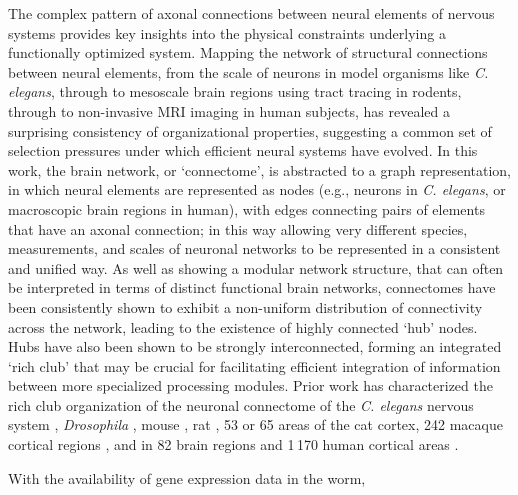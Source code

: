 \documentclass[10pt,letterpaper]{article}
\begin{document}
The complex pattern of axonal connections between neural elements of nervous systems provides key insights into the physical constraints underlying a functionally optimized system.
Mapping the network of structural connections between neural elements, from the scale of neurons in model organisms like \emph{C. elegans}, through to mesoscale brain regions using tract tracing in rodents, through to non-invasive MRI imaging in human subjects, has revealed a surprising consistency of organizational properties, suggesting a common set of selection pressures under which efficient neural systems have evolved.
In this work, the brain network, or `connectome', is abstracted to a graph representation, in which neural elements are represented as nodes (e.g., neurons in \emph{C. elegans}, or macroscopic brain regions in human), with edges connecting pairs of elements that have an axonal connection; in this way allowing very different species, measurements, and scales of neuronal networks to be represented in a consistent and unified way.
As well as showing a modular network structure, that can often be interpreted in terms of distinct functional brain networks, connectomes have been consistently shown to exhibit a non-uniform distribution of connectivity across the network, leading to the existence of highly connected `hub' nodes.
Hubs have also been shown to be strongly interconnected, forming an integrated `rich club' that may be crucial for facilitating efficient integration of information between more specialized processing modules.
Prior work has characterized the rich club organization of the neuronal connectome of the \emph{C. elegans} nervous system \cite{Towlson:2013gf}, \emph{Drosophila} \cite{Shih:2015cu}, mouse \cite{Fulcher:2016ck}, rat \cite{vandenHeuvel:2015ie}, 53 \cite{ZamoraLopez:2010hy} or 65 areas \cite{deReus:2013cy} of the cat cortex, 242 macaque cortical regions \cite{Harriger:2012bb}, and in 82 brain regions \cite{vandenHeuvel:2011he} and 1\,170 human cortical areas \cite{vandenHeuvel:2012kh}.

With the availability of gene expression data in the worm,
\end{document}

